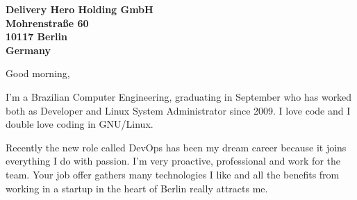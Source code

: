 \documentclass[a4paper]{willianpaixao-letter}
\begin{document}
\begin{letter}{\bfseries
Delivery Hero Holding GmbH\\Mohrenstraße 60\\10117 Berlin\\Germany}
\opening{Good morning,}

I'm a Brazilian Computer Engineering, graduating in September who has worked
both as Developer and Linux System Administrator since 2009. I love code and I
double love coding in GNU/Linux.

Recently the new role called DevOps has been my dream career because it joins
everything I do with passion. I'm very proactive, professional and work for the
team. Your job offer gathers many technologies I like and all the benefits from
working in a startup in the heart of Berlin really attracts me.





\end{letter}
\end{document}
